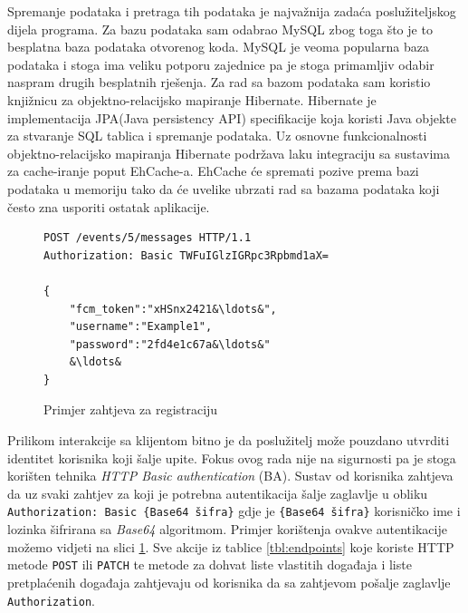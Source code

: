 \documentclass[times, utf8, zavrsni]{fer}
\begin{document}
{Spremanje podataka i pretraga tih podataka je najvažnija zadaća poslužiteljskog dijela programa. Za bazu podataka sam odabrao MySQL zbog toga što je to besplatna baza podataka otvorenog koda. MySQL je veoma popularna baza podataka i stoga ima veliku potporu zajednice pa je stoga primamljiv odabir naspram drugih besplatnih rješenja. Za rad sa bazom podataka sam koristio knjižnicu za objektno-relacijsko mapiranje Hibernate. Hibernate je implementacija JPA(Java persistency API) specifikacije koja koristi Java objekte za stvaranje SQL tablica i spremanje podataka. Uz osnovne funkcionalnosti objektno-relacijsko mapiranja Hibernate podržava laku integraciju sa sustavima za cache-iranje poput EhCache-a. EhCache će spremati pozive prema bazi podataka u memoriju tako da će uvelike ubrzati rad sa bazama podataka koji često zna usporiti ostatak aplikacije.

\begin{figure}
\begin{lstlisting}
POST /events/5/messages HTTP/1.1
Authorization: Basic TWFuIGlzIGRpc3Rpbmd1aX=

{
	"fcm_token":"xHSnx2421&\ldots&",
	"username":"Example1",
	"password":"2fd4e1c67a&\ldots&"
	&\ldots&
}
\end{lstlisting}
\caption{Primjer zahtjeva za registraciju}
\label{lst:register-request}
\end{figure}

Prilikom interakcije sa klijentom bitno je da poslužitelj može pouzdano utvrditi identitet korisnika koji šalje upite. Fokus ovog rada nije na sigurnosti pa je stoga korišten tehnika {\em HTTP Basic authentication} (BA). Sustav od korisnika zahtjeva da uz svaki zahtjev za koji je potrebna autentikacija šalje zaglavlje u obliku {\tt Authorization: Basic \{Base64 šifra\}} gdje je {\tt \{Base64 šifra\}} korisničko ime i lozinka šifrirana sa {\em Base64} algoritmom. Primjer korištenja ovakve autentikacije možemo vidjeti na slici \ref{lst:register-request}. Sve akcije iz tablice \ref{tbl:endpoints} koje koriste HTTP metode {\tt POST} ili {\tt PATCH} te metode za dohvat liste vlastitih događaja i liste pretplaćenih događaja zahtjevaju od korisnika da sa zahtjevom pošalje zaglavlje {\tt Authorization}.

}
\end{document}
